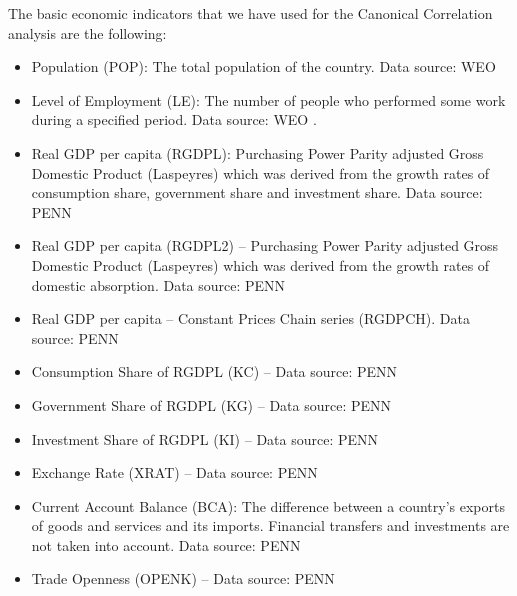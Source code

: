 The basic economic indicators that we have used for the Canonical Correlation analysis are the following:
\begin{itemize}
 \item Population (POP): The total population of the country. Data source: WEO \cite{weo2014}
 \item Level of Employment (LE): The number of people who performed some work during a specified period. Data source: WEO \cite{weo2014}.
 \item Real GDP per capita (RGDPL): Purchasing Power Parity adjusted Gross Domestic Product (Laspeyres) which was derived from the growth rates of consumption share, government share and investment share. Data source: PENN \cite{heston2002penn}
 \item Real GDP per capita (RGDPL2) -- Purchasing Power Parity adjusted Gross Domestic Product (Laspeyres) which was derived from the growth rates of domestic absorption. Data source: PENN \cite{heston2002penn}
 \item Real GDP per capita -- Constant Prices Chain series (RGDPCH). Data source: PENN \cite{heston2002penn}
 \item Consumption Share of RGDPL (KC) -- Data source: PENN \cite{heston2002penn}
 \item Government Share of RGDPL (KG) -- Data source: PENN \cite{heston2002penn}
 \item Investment Share of RGDPL (KI) -- Data source: PENN \cite{heston2002penn}
 \item Exchange Rate (XRAT) -- Data source: PENN \cite{heston2002penn}
 \item Current Account Balance (BCA): The difference between a country's exports of goods and services and its imports. Financial transfers and investments are not taken into account. Data source: PENN \cite{heston2002penn}
 \item Trade Openness (OPENK) -- Data source: PENN \cite{heston2002penn}
\end{itemize}

